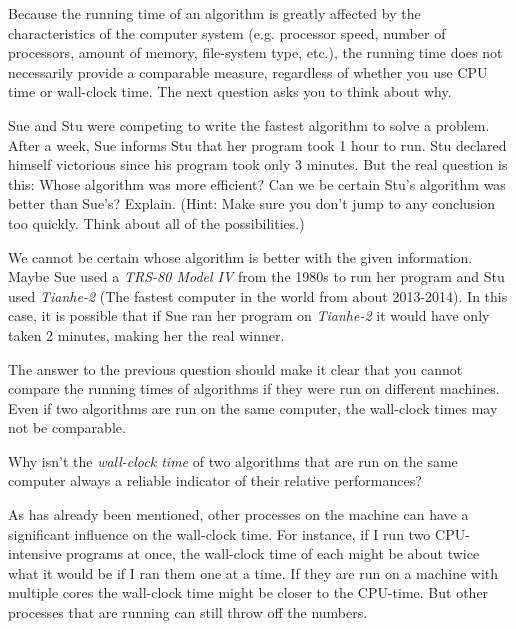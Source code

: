 Because the running time of an algorithm is greatly affected by the 
characteristics of the computer system 
(e.g. processor speed, number of processors, amount of memory, file-system type, etc.),
the running time does not necessarily provide a comparable measure, 
regardless of whether you use CPU time or wall-clock time.
The next question asks you to think about why.

\begin{ques}
Sue and Stu were competing to write the fastest algorithm to solve a problem.
After a week, Sue informs Stu that her program took 1 hour to run.  
Stu declared himself victorious since his program took only 3 minutes. 
But the real question is this:  Whose algorithm was more efficient?  
Can we be certain Stu's algorithm was better than Sue's?  Explain.
(Hint:  Make sure you don't jump to any conclusion too quickly.  Think about all of 
the possibilities.)

\noindent
\answerlinethree
\begin{answer}
We cannot be certain whose algorithm is better with the given information.  
Maybe Sue used a {\em TRS-80 Model IV} from the 1980s to run her program and Stu used 
{\em Tianhe-2} (The fastest computer in the world from about 2013-2014).  
In this case, it is possible that if Sue ran her program on {\em Tianhe-2} 
it would have only taken 2 minutes, making her the real winner.
\end{answer}
\end{ques}

The answer to the previous question should make it clear that you cannot compare the running times of algorithms
if they were run on different machines.  
Even if two algorithms are run on the same computer, the wall-clock times may not be comparable.

\begin{ques}
Why isn't the {\em wall-clock time} of two algorithms that are run on the same computer always
a reliable indicator of their relative performances?

\noindent
\answerlinethree
\begin{answer}
As has already been mentioned, other processes on the machine can have a significant influence
on the wall-clock time.  For instance, if I run two CPU-intensive programs at once, the wall-clock time of each might be about twice what it would be if I ran them one at a time.
If they are run on a machine with multiple cores
the wall-clock time might be closer to the CPU-time.  But other processes that are 
running can still throw off the numbers.
\end{answer}
\end{ques}

